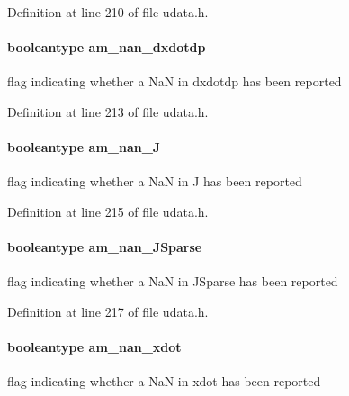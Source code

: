 Definition at line 210 of file udata.\+h.

\hypertarget{struct_user_data_a82073e35d78644037fb7570a4608d6de}{}
\paragraph[{am\+\_\+nan\+\_\+dxdotdp}]{\setlength{\rightskip}{0pt plus 5cm}booleantype am\+\_\+nan\+\_\+dxdotdp}\label{struct_user_data_a82073e35d78644037fb7570a4608d6de}
flag indicating whether a Na\+N in dxdotdp has been reported 

Definition at line 213 of file udata.\+h.

\hypertarget{struct_user_data_a9e2b4f94b4dbe949e636af5cabbd47cf}{}
\paragraph[{am\+\_\+nan\+\_\+\+J}]{\setlength{\rightskip}{0pt plus 5cm}booleantype am\+\_\+nan\+\_\+\+J}\label{struct_user_data_a9e2b4f94b4dbe949e636af5cabbd47cf}
flag indicating whether a Na\+N in J has been reported 

Definition at line 215 of file udata.\+h.

\hypertarget{struct_user_data_a56f3a28c756fe2ec27609fc7b6b8eba7}{}
\paragraph[{am\+\_\+nan\+\_\+\+J\+Sparse}]{\setlength{\rightskip}{0pt plus 5cm}booleantype am\+\_\+nan\+\_\+\+J\+Sparse}\label{struct_user_data_a56f3a28c756fe2ec27609fc7b6b8eba7}
flag indicating whether a Na\+N in J\+Sparse has been reported 

Definition at line 217 of file udata.\+h.

\hypertarget{struct_user_data_a53aa8cfb8e4f8c3b6684b6947cc1f5c8}{}
\paragraph[{am\+\_\+nan\+\_\+xdot}]{\setlength{\rightskip}{0pt plus 5cm}booleantype am\+\_\+nan\+\_\+xdot}\label{struct_user_data_a53aa8cfb8e4f8c3b6684b6947cc1f5c8}
flag indicating whether a Na\+N in xdot has been reported 


